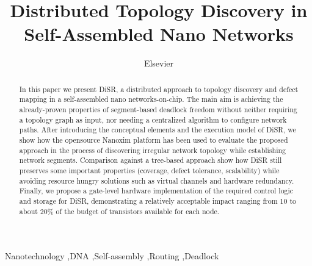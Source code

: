 \documentclass[a4]{article}
\newcommand{\disr}{{\sf DiSR}}
\begin{document}
\begin{frontmatter}

\title{Distributed Topology Discovery in Self-Assembled Nano Networks}

\author{Elsevier}
\address{Radarweg 29, Amsterdam}





\begin{abstract}
In this paper we present \disr{}, a distributed approach to topology
discovery and defect mapping in a self-assembled nano
networks-on-chip. The main aim is achieving the already-proven
properties of segment-based deadlock freedom without neither requiring
a topology graph as input, nor needing a centralized algorithm to
configure network paths.  After introducing the conceptual elements
and the execution model of \disr{}, we show how the opensource Nanoxim
platform has been used to evaluate the proposed approach in the
process of discovering irregular network topology while establishing
network segments. Comparison against a tree-based approach show how
\disr{} still preserves some important properties (coverage, defect
tolerance, scalability) while avoiding resource hungry solutions such
as virtual channels and hardware redundancy. Finally, we propose a
gate-level hardware implementation of the required control logic and
storage for \disr{}, demonstrating a relatively acceptable impact
ranging from 10 to about 20\% of the budget of transistors available
for each node.
\end{abstract}

\begin{keyword}
Nanotechnology \sep DNA \sep Self-assembly \sep Routing \sep Deadlock
\end{keyword}
\end{frontmatter}
\end{document}
